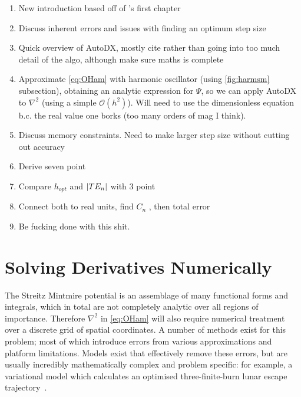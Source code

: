 \begin{enumerate}
  \item New introduction based off of \citeauthor{Mathur2012}'s first chapter
  \item Discuss inherent errors and issues with finding an optimum step size
  \item Quick overview of AutoDX, mostly cite \cite{Mathur2012} rather than going into too much detail of the algo, although make sure maths is complete
  \item Approximate \cref{eq:OHam} with harmonic oscillator (using \cref{fig:harmsm} subsection), obtaining an analytic expression for $\Psi$, so we can apply AutoDX to $\nabla^2$ (using a simple $\mathcal{O}(h^2)$). Will need to use the dimensionless equation b.c. the real value one borks (too many orders of mag I think).
  \item Discuss memory constraints. Need to make larger step size without cutting out accuracy
  \item Derive seven point
  \item Compare $h_{opt}$ and $\left\lvert TE_n\right\rvert$ with 3 point
  \item Connect both to real units, find $C_n$ \etc, then total error
  \item Be fucking done with this shit.
\end{enumerate}

\section{Solving Derivatives Numerically}\label{sec:numder}
The Streitz Mintmire potential \cite{Streitz1994} is an assemblage of many functional forms and integrals, which in total are not completely analytic over all regions of importance.
Therefore $\nabla^2$ in \cref{eq:OHam} will also require numerical treatment over a discrete grid of spatial coordinates.
A number of methods exist for this problem; most of which introduce errors from various approximations and platform limitations.
Models exist that effectively remove these errors, but are usually incredibly mathematically complex and problem specific: for example, a variational model which calculates an optimised three-finite-burn lunar escape trajectory~\cite{Ocampo2012}.

